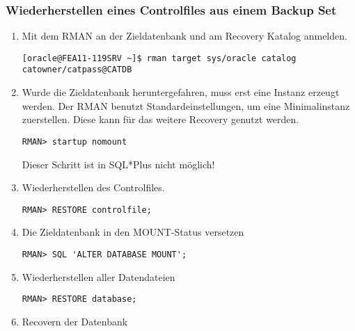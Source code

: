         \subsubsection{Wiederherstellen eines Controlfiles aus einem Backup Set}
          \begin{enumerate}
            \item Mit dem RMAN an der Zieldatenbank und am Recovery Katalog anmelden.
              \begin{lstlisting}[caption={An der Zieldatenbank und am Recovery Katalog anmelden},label=admin1509,language=rman]
[oracle@FEA11-119SRV ~]$ rman target sys/oracle catalog catowner/catpass@CATDB
              \end{lstlisting}
            \item Wurde die Zieldatenbank heruntergefahren, muss erst eine Instanz erzeugt werden. Der RMAN benutzt Standardeinstellungen, um eine Minimalinstanz zuerstellen. Diese kann f\"ur das weitere Recovery genutzt werden.
              \begin{lstlisting}[caption={Zieldatenbank im RMAN in den NOMOUNT-Status bringen},label=admin1510,language=rman,alsolanguage=sqlplus]
RMAN> startup nomount
              \end{lstlisting}
              \begin{merke}
                Dieser Schritt ist in SQL*Plus nicht m\"oglich!
              \end{merke}
            \item Wiederherstellen des Controlfiles.
              \begin{lstlisting}[caption={Wiederherstellen des Controlfiles},label=admin1511,language=rman]
RMAN> RESTORE controlfile;
              \end{lstlisting}
            \item Die Zieldatenbank in den MOUNT-Status versetzen
              \begin{lstlisting}[caption={Zieldatenbank mounten},label=admin1512,language=rman,emph={[9]ALTER,DATABASE,MOUNT},emphstyle={[9]\color{magenta}\bfseries}]
RMAN> SQL 'ALTER DATABASE MOUNT';
              \end{lstlisting}
            \item Wiederherstellen aller Datendateien
              \begin{lstlisting}[caption={Datendateien wiederherstellen},label=admin1513,language=rman]
RMAN> RESTORE database;
              \end{lstlisting}
            \item Recovern der Datenbank

\end{enumerate}
